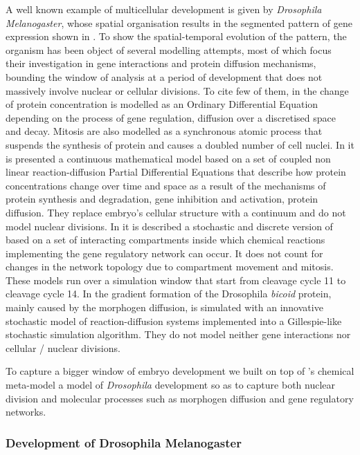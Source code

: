 \documentclass[12pt,a4paper,twoside,openright]{book}
\begin{document}
A well known example of multicellular development is given by \emph{Drosophila Melanogaster}, whose spatial organisation results in the segmented pattern of gene expression shown in  . 
%
To show the spatial-temporal evolution of the pattern, the organism has been object of several modelling attempts, most of which focus their investigation in gene interactions and protein diffusion mechanisms, bounding the window of analysis at a period of development that does not massively involve nuclear or cellular divisions. 
%
To cite few of them, in \cite{reinitz95} the change of protein concentration is modelled as an Ordinary Differential Equation depending on the process of gene regulation, diffusion over a  discretised space and decay.  Mitosis are also modelled as a synchronous  atomic process that suspends the synthesis of protein and causes a doubled number of cell nuclei.
%
In \cite{gursky04} it is presented a continuous mathematical model based on a set of coupled non linear reaction-diffusion Partial Differential Equations  that describe how protein concentrations change over time and space as a result of the mechanisms of protein synthesis and degradation, gene inhibition and activation, protein diffusion. They replace embryo's cellular structure with a continuum and do not model nuclear divisions. 
%
%
In \cite{montagna-cs2bio10} it is described a stochastic and discrete version of  \cite{gursky04} based on a set of interacting compartments inside which chemical reactions implementing the gene regulatory network can occur. It does not count for changes in the network topology due to compartment movement and mitosis.
%
These models run over a simulation window that start from cleavage cycle 11 to cleavage cycle 14.
%
In \cite{LeccaJIB2010} the gradient formation of the Drosophila \emph{bicoid} protein, mainly caused by the morphogen diffusion, is simulated with an innovative stochastic model of reaction-diffusion systems implemented into a Gillespie-like stochastic simulation algorithm. They do not model neither gene interactions nor cellular / nuclear divisions.
%

To capture a bigger window of embryo development we built on top of \alchemist{}'s chemical meta-model a model of \emph{Drosophila} development so as to capture  both nuclear division and molecular processes such as  morphogen diffusion and gene regulatory networks.

\subsubsection{Development of Drosophila Melanogaster}
\end{document}

